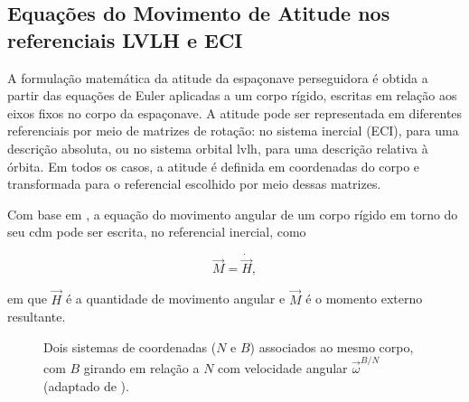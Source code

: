 \subsection{Equações do Movimento de Atitude nos referenciais LVLH e ECI}
\label{sec:atitude_inercial}

A formulação matemática da atitude da espaçonave perseguidora é obtida a partir das equações de Euler aplicadas a um corpo rígido, escritas em relação aos eixos fixos no corpo da espaçonave.
A atitude pode ser representada em diferentes referenciais por meio de matrizes de rotação: no sistema inercial (ECI), para uma descrição absoluta, ou no sistema orbital \gls{lvlh}, para uma descrição relativa à órbita.
Em todos os casos, a atitude é definida em coordenadas do corpo e transformada para o referencial escolhido por meio dessas matrizes.

Com base em \cite{wie2008space}, a equação do movimento angular de um corpo rígido em torno do seu \gls{cdm} pode ser escrita, no referencial inercial, como

\begin{equation}
\vec{M}
=
\dot{\vec{H}},
\label{eq:wie_M_Hdot}
\end{equation}

em que $\vec{H}$ é a quantidade de movimento angular e $\vec{M}$ é o momento externo resultante.

\begin{figure}[H]
\centering
{}
\caption{Dois sistemas de coordenadas ($N$ e $B$) associados ao mesmo corpo, com $B$ girando em relação a $N$ com velocidade angular $\vec{\omega}^{B/N}$ (adaptado de \cite{wie2008space}).}
\label{fig:wie_ref_N_B}
\end{figure}

